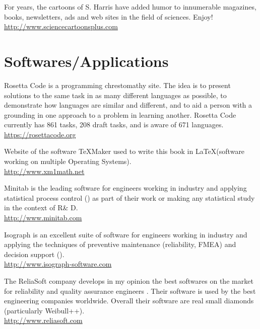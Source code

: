	{\Large {}}{\Large {}} For years, the cartoons of S. Harris have added humor to innumerable magazines, books, newsletters, ads and web sites in the field of sciences. Enjoy!\\
	\href{http://www.sciencecartoonsplus.com}{\color{blue}http://www.sciencecartoonsplus.com}
	
	\pagebreak
	\section{Softwares/Applications}
	{\Large {}}{\Large {}}{\Large {}} Rosetta Code is a programming chrestomathy site. The idea is to present solutions to the same task in as many different languages as possible, to demonstrate how languages are similar and different, and to aid a person with a grounding in one approach to a problem in learning another. Rosetta Code currently has 861 tasks, 208 draft tasks, and is aware of 671 languages.\\
	\href{https://rosettacode.org/wiki/Category:Programming_Tasks}{\color{blue}https://rosettacode.org}
	
	{\Large {}}{\Large {}}{\Large {}}{\Large {}} Website of the software TeXMaker used to write this book in \LaTeX (software working on multiple Operating Systems).\\
	\href{http://www.xm1math.net/texmaker/index.html}{\color{blue}http://www.xm1math.net}
	
	{\Large {}}{\Large {}}{\Large {}}{\Large {}} Minitab is the leading software for engineers working in industry and applying statistical process control () as part of their work or making any statistical study in the context of R\& D.\\
	\href{http://www.minitab.com}{\color{blue}http://www.minitab.com}
	
	{\Large {}}{\Large {}}{\Large {}}{\Large {}} Isograph is an excellent suite of software for engineers working in industry and applying the techniques of preventive maintenance (reliability, FMEA) and decision support ().\\
	\href{http://www.isograph-software.com}{\color{blue}http://www.isograph-software.com}
	
	{\Large {}}{\Large {}}{\Large {}}{\Large {}} The ReliaSoft company develops in my opinion the best softwares on the market for reliability and quality assurance engineers . Their software is used by the best engineering companies worldwide. Overall their software are real small diamonds (particularly Weibull++).\\
	\href{http://www.reliasoft.com}{\color{blue}http://www.reliasoft.com}
	
